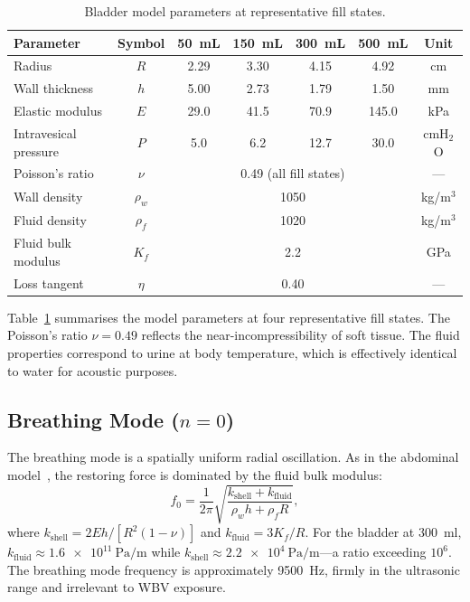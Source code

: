 \begin{table}[htbp]
  \centering
  \caption{Bladder model parameters at representative fill states.}
  \label{tab:params}
  \begin{tabular}{lcccccc}
    \toprule
    Parameter & Symbol & 50~mL & 150~mL & 300~mL & 500~mL & Unit \\
    \midrule
    Radius & $R$ & 2.29 & 3.30 & 4.15 & 4.92 & cm \\
    Wall thickness & $h$ & 5.00 & 2.73 & 1.79 & 1.50 & mm \\
    Elastic modulus & $E$ & 29.0 & 41.5 & 70.9 & 145.0 & kPa \\
    Intravesical pressure & $P$ & 5.0 & 6.2 & 12.7 & 30.0 & cmH$_2$O \\
    Poisson's ratio & $\nu$ & \multicolumn{4}{c}{0.49 (all fill states)} & --- \\
    Wall density & $\rho_w$ & \multicolumn{4}{c}{1050} & kg/m$^3$ \\
    Fluid density & $\rho_f$ & \multicolumn{4}{c}{1020} & kg/m$^3$ \\
    Fluid bulk modulus & $K_f$ & \multicolumn{4}{c}{2.2} & GPa \\
    Loss tangent & $\eta$ & \multicolumn{4}{c}{0.40} & --- \\
    \bottomrule
  \end{tabular}
\end{table}

Table~\ref{tab:params} summarises the model parameters at four representative
fill states.  The Poisson's ratio $\nu = 0.49$ reflects the near-incompressibility
of soft tissue.  The fluid properties correspond to urine at body temperature,
which is effectively identical to water for acoustic purposes.


\subsection{Breathing Mode ($n = 0$)}
\label{sec:breathing}

The breathing mode is a spatially uniform radial oscillation.  As in the
abdominal model~\cite{Mace2026browntone}, the restoring force is dominated
by the fluid bulk modulus:
\begin{equation}\label{eq:f0}
  f_0 = \frac{1}{2\pi}\sqrt{\frac{k_\mathrm{shell} + k_\mathrm{fluid}}
  {\rho_w h + \rho_f R}},
\end{equation}
where $k_\mathrm{shell} = 2Eh / [R^2(1-\nu)]$ and
$k_\mathrm{fluid} = 3K_f/R$.  For the bladder at \SI{300}{\milli\litre},
$k_\mathrm{fluid} \approx \SI{1.6e11}{\pascal\per\metre}$ while
$k_\mathrm{shell} \approx \SI{2.2e4}{\pascal\per\metre}$---a ratio
exceeding $10^6$.  The breathing mode frequency is approximately
\SI{9500}{\hertz}, firmly in the ultrasonic range and irrelevant to
WBV exposure.


